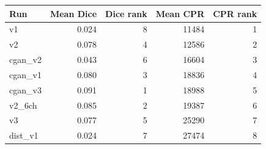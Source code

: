 \begin{tabular}{l r r r r}
\toprule
Run & Mean Dice & Dice rank & Mean CPR & CPR rank \\
\midrule
v1 & 0.024 & 8 & 11484 & 1 \\
v2 & 0.078 & 4 & 12586 & 2 \\
cgan\_v2 & 0.043 & 6 & 16604 & 3 \\
cgan\_v1 & 0.080 & 3 & 18836 & 4 \\
cgan\_v3 & 0.091 & 1 & 18988 & 5 \\
v2\_6ch & 0.085 & 2 & 19387 & 6 \\
v3 & 0.077 & 5 & 25290 & 7 \\
dist\_v1 & 0.024 & 7 & 27474 & 8 \\
\bottomrule
\end{tabular}
